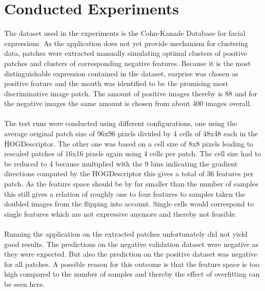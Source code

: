\section{Conducted Experiments}

The dataset used in the experiments is the Cohn-Kanade Database for facial expressions.\cite{Kanade2000CK+}\cite{Lucey2010CK+} As the application does not yet provide mechanism for clustering data, patches were extracted manually simulating optimal clusters of positive patches and clusters of corresponding negative features. Because it is the most distinguishable expression contained in the dataset, surprise was chosen as positive feature and the mouth was identified to be the promising most discriminative image patch. The amount of positive images thereby is 88 and for the negative images the same amount is chosen from about 400 images overall.
\\
\\
The test runs were conducted using different configurations, one using the average original patch size of 96x96 pixels divided by 4 cells of 48x48 each in the HOGDescriptor. The other one was based on a cell size of 8x8 pixels leading to rescaled patches of 16x16 pixels again using 4 cells per patch. The cell size had to be reduced to 4 because multiplied with the 9 bins indicating the gradient directions computed by the HOGDescriptor this gives a total of 36 features per patch. As the feature space should be by far smaller than the number of samples this still gives a relation of roughly one to four features to samples taken the doubled images from the flipping into account. Single cells would correspond to single features which are not expressive anymore and thereby not feasible.
\\
\\
Running the application on the extracted patches unfortunately did not yield good results. The predictions on the negative validation dataset were negative as they were expected. But also the prediction on the positive dataset was negative for all patches. A possible reason for this outcome is that the feature space is too high compared to the number of samples and thereby the effect of overfitting can be seen here.
